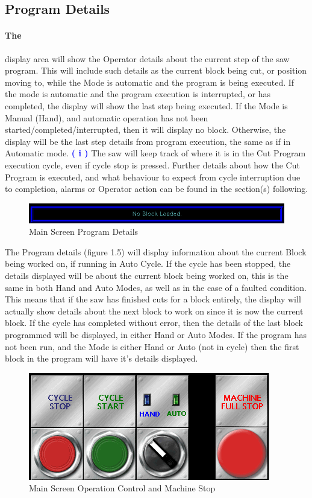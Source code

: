 \subsection{Program Details} \paragraph*{The}display area will show the Operator details about the current step of the saw program. This will include such details as the current block being cut, or position moving to, while the Mode is automatic and the program is being executed. If the mode is automatic and the program execution is interrupted, or has completed, the display will show the last step being executed. If the Mode is Manual (Hand), and automatic operation has not been started/completed/interrupted, then it will display no block. Otherwise, the display will be the last step details from program execution, the same as if in Automatic mode. 
\textbf{\LARGE \textcolor{blue}{( i )}} The saw will keep track of where it is in the Cut Program execution cycle, even if cycle stop is pressed. Further details about how the Cut Program is executed, and what behaviour to expect from cycle interruption due to completion, alarms or Operator action can be found in the section(s) following.
\begin{figure}
	\centering
	\includegraphics[width=.95\linewidth]{screen-captures/main/main-pgm-step}
	\caption{Main Screen Program Details}
	\label{fig:main-prg-det}
\end{figure}
The Program details (figure 1.5) will display information about the current Block being worked on, if running in Auto Cycle. If the cycle has been stopped, the details displayed will be about the current block being worked on, this is the same in both Hand and Auto Modes, as well as in the case of a faulted condition. This means that if the saw has finished cuts for a block entirely, the display will actually show details about the next block to work on since it is now the current block. If the cycle has completed without error, then the details of the last block programmed will be displayed, in either Hand or Auto Modes. If the program has not been run, and the Mode is either Hand or Auto (not in cycle) then the first block in the program will have it's details displayed. 
\pagebreak
\begin{figure}
	\centering
	\includegraphics[width=.75\linewidth]{screen-captures/main/main-screen-opctl}
	\caption{Main Screen Operation Control and Machine Stop}
	\label{fig:main-opctl}
\end{figure}
